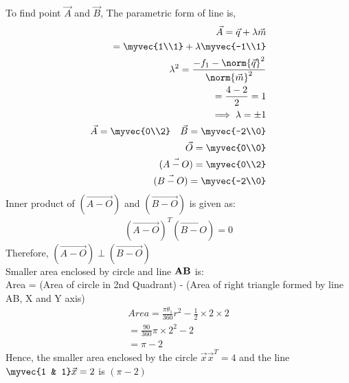 To find point $\vec{A}$ and $\vec{B}$,
The parametric form of line is,
\begin{align}
    \vec{A} = \vec{q}+\lambda\vec{m}\label{eq:solutions/1/11/eq9}\\
            = \myvec{1\\1}+\lambda\myvec{-1\\1}\label{eq:solutions/1/11/eq10}\\
    \lambda^2 = \frac{-f_1-\norm{\vec{q}}^2}{\norm{\vec{m}}^2}\label{eq:solutions/1/11/eq11}\\
                = \frac{4-2}{2} = 1\label{eq:solutions/1/11/eq12}\\
    \implies \lambda = \pm{1} \label{eq:solutions/1/11/eq13}\\
    \vec{A} = \myvec{0\\2}\quad \vec{B} = \myvec{-2\\0}\label{eq:solutions/1/11/eq14}\\
    \vec{O} = \myvec{0\\0} \\
    (\vec{A-O}) = \myvec{0\\2}\\
    (\vec{B-O}) = \myvec{-2\\0}
\end{align}
Inner product of $(\vec{A-O})$ and $(\vec{B-O})$ is given as:
\begin{align}
(\vec{A-O})^T(\vec{B-O})=0
\end{align}
Therefore, $(\vec{A-O}) \perp (\vec{B-O})$ \\
Smaller area enclosed by circle and line $\bf{AB}$ is:\\
 Area = (Area of circle in 2nd Quadrant) - (Area of right triangle formed by line AB, X and Y axis)
 \begin{align}
Area=\frac{\pi\theta_1}{360}r^2-\frac{1}{2}\times2\times2\label{eq:solutions/1/11/eq15}\\
=\frac{90}{360}\pi\times2^2-2\label{eq:solutions/1/11/eq16}\\
=\pi-2\label{eq:solutions/1/11/eq17}
\end{align}
Hence, the smaller area enclosed by the circle  $\vec{x}\vec{x}^T=4$ and the line $\myvec{1 & 1} \vec{x}=2$ is $(\pi-2)$
